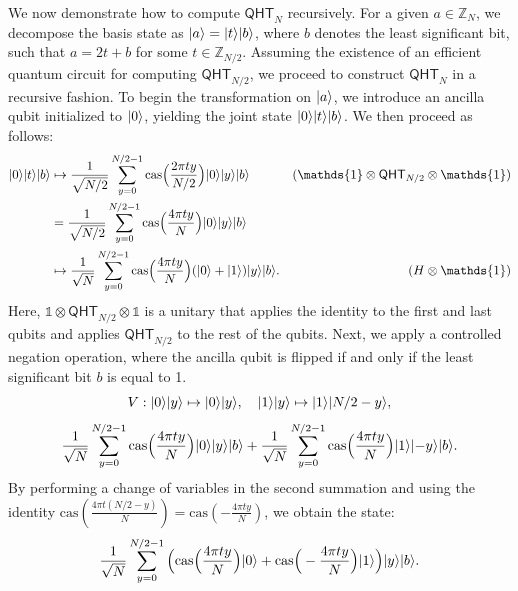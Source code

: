\documentclass[12pt]{report}
\newcommand{\cas}{\mathrm{cas}}
\newcommand{\qht}{\mathsf{QHT}}
\begin{document}
We now demonstrate how to compute \( \qht_N \) recursively. For a given \( a \in \mathbb{Z}_N \), we decompose the basis state as \( \lvert a\rangle = \lvert t\rangle\lvert b\rangle \), where \( b \) denotes the least significant bit, such that \( a = 2t + b \) for some \( t \in \mathbb{Z}_{N/2} \). Assuming the existence of an efficient quantum circuit for computing \( \qht_{N/2} \), we proceed to construct \( \qht_N \) in a recursive fashion. To begin the transformation on \( \lvert a\rangle \), we introduce an ancilla qubit initialized to \( \lvert0\rangle \), yielding the joint state \( \lvert0\rangle\lvert t\rangle\lvert b\rangle \). We then proceed as follows:
\begin{align*}
	\ket{0}\ket{t}\ket{b}
    & \mapsto \frac{1}{\sqrt{N / 2}} \sum_{y = 0}^{N / 2 - 1} \cas\Big( \frac{2\pi t y}{N / 2} \Big) \ket{0} \ket{y} \ket{b} & (\mathds{1} \otimes \qht_{N / 2} \otimes \mathds{1}) \\
    & = \frac{1}{\sqrt{N / 2}} \sum_{y = 0}^{N / 2 - 1} \cas\Big( \frac{4\pi t y}{N} \Big) \ket{0} \ket{y} \ket{b} \\
    & \mapsto \frac{1}{\sqrt{N}} \sum_{y = 0}^{N / 2 - 1} \cas\Big( \frac{4\pi t y}{N} \Big) (\ket{0} + \ket{1}) \ket{y}\ket{b}. & (H \otimes \mathds{1})
\end{align*}
Here, $\mathds{1} \otimes \qht_{N / 2} \otimes \mathds{1}$ is a unitary that applies the identity to the first and last qubits and applies $\qht_{N/2}$ to the rest of the qubits. Next, we apply a controlled negation operation, where the ancilla qubit is flipped if and only if the least significant bit \( b \) is equal to 1.
\[
    V: \lvert0\rangle\lvert y\rangle \mapsto \lvert0\rangle\lvert y\rangle, \quad \lvert1\rangle\lvert y\rangle \mapsto \lvert1\rangle\lvert N / 2 -y\rangle,
\]
\[
    \frac{1}{\sqrt{N}} \sum_{y = 0}^{N / 2 - 1} \cas\Big( \frac{4\pi t y}{N} \Big) \ket{0} \ket{y} \ket{b} + \frac{1}{\sqrt{N}} \sum_{y = 0}^{N / 2 - 1} \cas\Big( \frac{4\pi t y}{N} \Big) \ket{1} \ket{-y} \ket{b}.
\]
By performing a change of variables in the second summation and using the identity \( \cas\left(\frac{4\pi t (N / 2 - y)}{N}\right) = \cas\left(-\frac{4\pi t y}{N}\right) \), we obtain the state:
\[
    \frac{1}{\sqrt{N}} \sum_{y = 0}^{N / 2 - 1} \Big( \cas\Big( \frac{4\pi t y}{N} \Big) \ket{0} + \cas\Big( -\frac{4\pi t y}{N} \Big) \ket{1} \Big) \ket{y} \ket{b}.
\]
\end{document}
